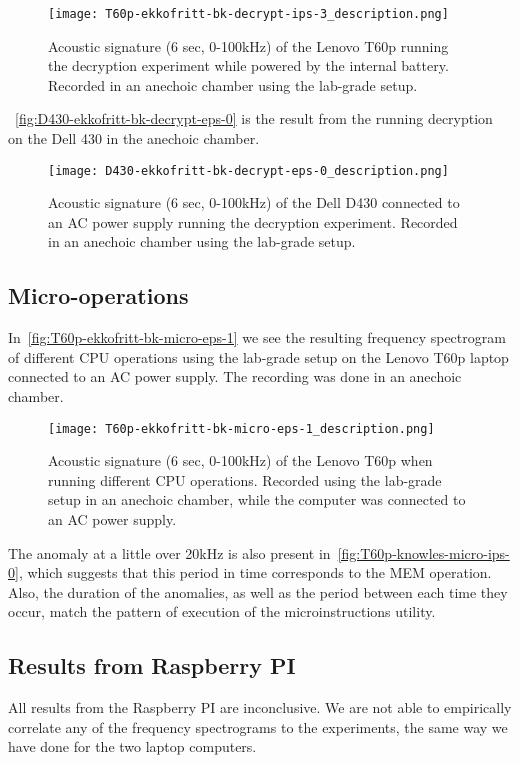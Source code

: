 \begin{figure}[ht]
    \centering
    \texttt{[image: T60p-ekkofritt-bk-decrypt-ips-3\_description.png]}
    \caption{Acoustic signature (6 sec, 0-100kHz) of the Lenovo T60p running the decryption experiment while powered by the internal battery. 
    Recorded in an anechoic chamber using the lab-grade setup. }
    \label{fig:T60p-ekkofritt-bk-decrypt-ips-3}
\end{figure}


~\autoref{fig:D430-ekkofritt-bk-decrypt-eps-0} is the result from the running decryption on the Dell 430 in the anechoic chamber. 
\begin{figure}[ht]
    \centering
    \texttt{[image: D430-ekkofritt-bk-decrypt-eps-0\_description.png]}
    \caption{Acoustic signature (6 sec, 0-100kHz) of the Dell D430 connected to an AC power supply running the decryption experiment.
        Recorded in an anechoic chamber using the lab-grade setup.}
    \label{fig:D430-ekkofritt-bk-decrypt-eps-0}
\end{figure}



\subsection{Micro-operations}\label{chp5:subsec:t60p_bk_results_micro}
In~\autoref{fig:T60p-ekkofritt-bk-micro-eps-1} we see the resulting frequency spectrogram of different \gls{CPU} operations using the lab-grade setup on the Lenovo T60p laptop connected to an AC power supply.
The recording was done in an anechoic chamber.

\begin{figure}[ht]
    \centering
    \texttt{[image: T60p-ekkofritt-bk-micro-eps-1\_description.png]}
    \caption{Acoustic signature (6 sec, 0-100kHz) of the Lenovo T60p when running different \gls{CPU} operations.
        Recorded using the lab-grade setup in an anechoic chamber, while the computer was connected to an AC power supply.}
    \label{fig:T60p-ekkofritt-bk-micro-eps-1}
\end{figure}

The anomaly at a little over 20kHz is also present in~\autoref{fig:T60p-knowles-micro-ips-0}, which suggests that this period in time corresponds to the MEM operation.
Also, the duration of the anomalies, as well as the period between each time they occur, match the pattern of execution of the microinstructions utility.


\subsection{Results from Raspberry PI}\label{chp5:subsec:rb_bk_results}
All results from the Raspberry PI are inconclusive.
We are not able to empirically correlate any of the frequency spectrograms to the experiments, the same way we have done for the two laptop computers.
